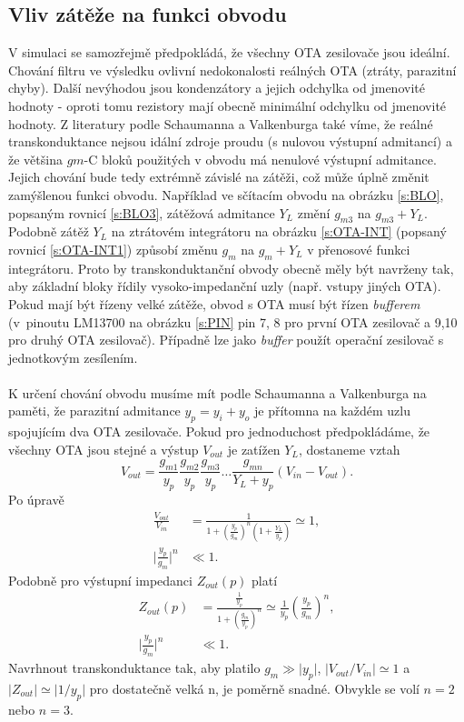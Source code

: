 \subsection{Vliv zátěže na funkci obvodu}
\noindent V simulaci se samozřejmě předpokládá, že všechny OTA zesilovače jsou ideální. Chování filtru ve výsledku ovlivní nedokonalosti reálných OTA (ztráty, parazitní chyby). Další nevýhodou jsou kondenzátory a jejich odchylka od jmenovité hodnoty - oproti tomu rezistory mají obecně minimální odchylku od jmenovité hodnoty. Z literatury podle Schaumanna a Valkenburga \cite{13} také víme, že reálné transkonduktance nejsou idální zdroje proudu (s nulovou výstupní admitancí) a že většina $gm$-C bloků použitých v obvodu má nenulové výstupní admitance. Jejich chování bude tedy extrémně závislé na zátěži, což může úplně změnit zamýšlenou funkci obvodu. Například ve sčítacím obvodu na obrázku \ref{s:BLO}, popsaným rovnicí \ref{s:BLO3}, zátěžová admitance $Y_L$ změní $g_{m3}$ na $g_{m3} + Y_L$. Podobně zátěž $Y_L$ na ztrátovém integrátoru na obrázku \ref{s:OTA-INT} (popsaný rovnicí \ref{s:OTA-INT1}) způsobí změnu $g_m$ na $g_m + Y_L$ v přenosové funkci integrátoru. Proto by transkonduktanční obvody obecně měly být navrženy tak, aby základní bloky řídily vysoko-impedanční uzly (např. vstupy jiných OTA). Pokud mají být řízeny velké zátěže, obvod s OTA musí být řízen \textit{bufferem} (v~pinoutu LM13700 na obrázku \ref{s:PIN} pin 7, 8 pro první OTA zesilovač a 9,10 pro druhý OTA zesilovač). Případně lze jako \textit{buffer} použít operační zesilovač s jednotkovým zesílením.\\
\\
\noindent K určení chování obvodu musíme mít podle Schaumanna a Valkenburga \cite{13} na paměti, že parazitní admitance $y_p = y_i + y_o$ je přítomna na každém uzlu spojujícím dva OTA zesilovače. Pokud pro jednoduchost předpokládáme, že všechny OTA jsou stejné a výstup $V_{out}$ je zatížen $Y_L$, dostaneme vztah
\begin{equation}
V_{out} = \frac{g_{m1}}{y_p}\frac{g_{m2}}{y_p}\frac{g_{m3}}{y_p} \ldots \frac{g_{mn}}{Y_L + y_p}(V_{in} - V_{out}).
\end{equation}
\noindent Po úpravě
\begin{align}
\frac{V_{out}}{V_{in}} &= \frac{1}{1 + (\frac{y_p}{g_m})^n(1 + \frac{Y_L}{y_p})} \simeq 1,\\
\lvert \frac{y_p}{g_m} \rvert ^n &\ll 1.
\end{align}
\noindent Podobně pro výstupní impedanci $Z_{out}(p)$ platí
\begin{align}
Z_{out}(p) &= \frac{\frac{1}{y_p}}{1 + (\frac{g_m}{y_p})^n} \simeq \frac{1}{y_p}(\frac{y_p}{g_m})^n,\\
\lvert \frac{y_p}{g_m} \rvert ^n &\ll 1.
\end{align}
\noindent Navrhnout transkonduktance tak, aby platilo $g_m \gg \lvert y_p \rvert$, $\lvert V_{out}/V_{in} \rvert  \simeq 1$ a $\lvert Z_{out} \rvert \simeq \lvert 1/y_p \rvert$ pro dostatečně velká n, je poměrně snadné. Obvykle se volí $n = 2$ nebo $n = 3$.
